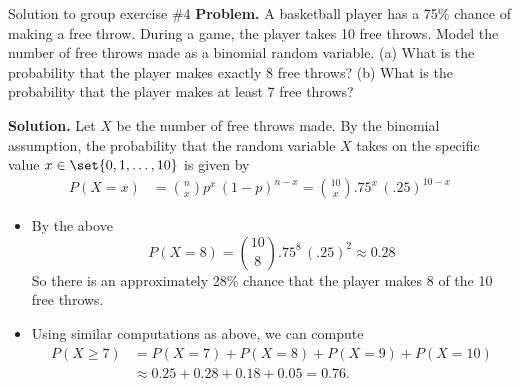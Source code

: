 \documentclass[10pt]{beamer}
\begin{document}
\begin{frame}{Solution to group exercise \#4}
\footnotesize 
\textbf{Problem.} 	A basketball player has a 75\% chance of making a free throw. During a game, the player takes 10 free throws. Model the number of free throws made as a binomial random variable.  (a) What is the probability that the player makes exactly 8 free throws? (b) What is the probability that the player makes at least 7 free throws?
\vfill 

\small 
\textbf{Solution.} 
Let $X$ be the number of free throws made.  By the binomial assumption, the probability that the random variable $X$ takes on the specific value $x \in \set{0,1,\hdots, 10}$ is given by
%
\begin{align*}
P(X=x) &= \binom{n}{x} p^x \, (1-p)^{n-x} = \binom{10}{x} .75^x \, (.25)^{10-x} 
\end{align*}
%
\vspace{-.2cm}
\begin{itemize}\small   
	\item[a.] By the above
	\[P(X=8) = \binom{10}{8} .75^8\, (.25)^{2} \approx 0.28 \]
	So there is an approximately 28\% chance that the player makes 8 of the 10 free throws.
	\item[b.] Using similar computations as above, we can compute
	\begin{align*}
	P(X \geq 7) &= P(X=7) + P(X=8) + P(X=9) + P(X=10) \\
	& \approx 0.25 + 0.28 + 0.18 + 0.05 = 0.76.
	\end{align*}
	\end{itemize}
		
\vfill 
\end{frame}
\end{document}

